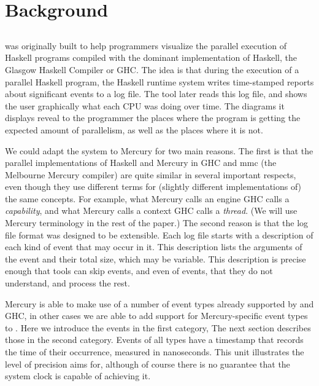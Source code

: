 \section{Background}
\label{sec:background}

\subsection{\tscope}

\tscope was originally built
to help programmers visualize the parallel execution of Haskell programs
compiled with the dominant implementation of Haskell,
the Glasgow Haskell Compiler or GHC.
The idea is that during the execution of a parallel Haskell program,
the Haskell runtime system writes time-stamped reports
about significant events to a log file.
The \tscope tool later reads this log file,
and shows the user graphically what each CPU was doing over time.
The diagrams it displays reveal to the programmer
the places where the program is getting the expected amount of parallelism,
as well as the places where it is not.

We could adapt the \tscope system to Mercury for two main reasons.
The first is that the parallel implementations of Haskell and Mercury
in GHC and mmc (the Melbourne Mercury compiler)
are quite similar in several important respects,
even though they use different terms for
(slightly different implementations of) the same concepts.
For example, what Mercury calls an engine GHC calls a \emph{capability},
and what Mercury calls a context GHC calls a \emph{thread}.
(We will use Mercury terminology in the rest of the paper.)
The second reason is that
the \tscope log file format was designed to be extensible.
Each log file starts with a description
of each kind of event that may occur in it.
This description lists the arguments of the event and their total size,
which may be variable.
This description is precise enough that tools 
can skip events, and even of events, that they do not understand,
and process the rest.

Mercury is able to make use of a number of event types already supported by
\tscope and GHC,
in other cases we are able to add support for Mercury-specific event types to
\tscope.
Here we introduce the events in the first category,
The next section describes those in the second category.
Events of all types have a timestamp
that records the time of their occurrence, measured in nanoseconds.
This unit illustrates the level of precision \tscope aims for,
although of course there is no guarantee
that the system clock is capable of achieving it.

